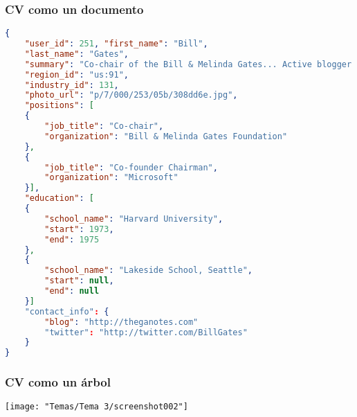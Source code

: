 \subsubsection{CV como un documento}
\begin{lstlisting}[language=json]
{
	"user_id": 251,	"first_name": "Bill",
	"last_name": "Gates",
	"summary": "Co-chair of the Bill & Melinda Gates... Active blogger.",
	"region_id": "us:91",
	"industry_id": 131,
	"photo_url": "p/7/000/253/05b/308dd6e.jpg",
	"positions": [
	{
		"job_title": "Co-chair",
		"organization": "Bill & Melinda Gates Foundation"
	},
	{
		"job_title": "Co-founder Chairman",
		"organization": "Microsoft"
	}],
	"education": [
	{
		"school_name": "Harvard University",
		"start": 1973,
		"end": 1975
	},
	{
		"school_name": "Lakeside School, Seattle",
		"start": null,
		"end": null
	}]
	"contact_info": {
		"blog": "http://theganotes.com"
		"twitter": "http://twitter.com/BillGates"
	}
}
\end{lstlisting}
\subsubsection{CV como un árbol}
\begin{center}
	\texttt{[image: "Temas/Tema 3/screenshot002"]}
\end{center}
